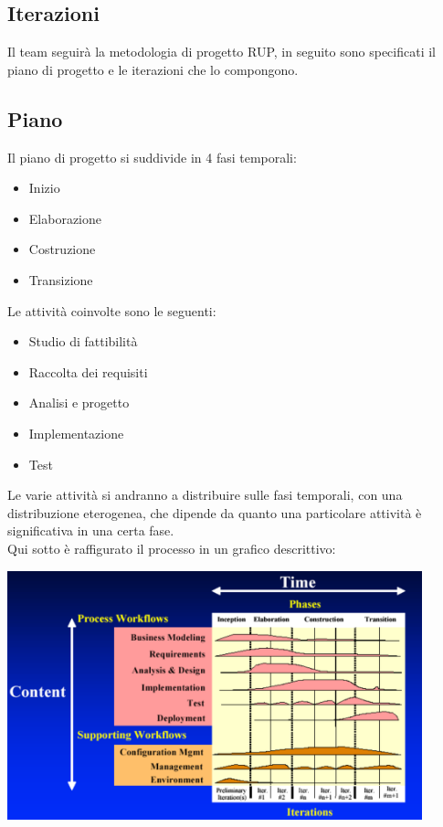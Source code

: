 \setlength{\arrayrulewidth}{.5mm}
\setlength{\tabcolsep}{5pt}
\renewcommand{\arraystretch}{2}

\subsection{Iterazioni}
Il team seguirà la metodologia di progetto RUP, in seguito sono specificati il piano di progetto e le
iterazioni che lo compongono.

\subsection{Piano}
Il piano di progetto si suddivide in 4 fasi temporali:
\begin{itemize}
    \item Inizio
    \item Elaborazione
    \item Costruzione
    \item Transizione
\end{itemize}
Le attività coinvolte sono le seguenti:
\begin{itemize}
    \item Studio di fattibilità
    \item Raccolta dei requisiti
    \item Analisi e progetto
    \item Implementazione
    \item Test
\end{itemize}
Le varie attività si andranno a distribuire sulle fasi temporali, con una distribuzione eterogenea, che
dipende da quanto una particolare attività è significativa in una certa fase.\\
Qui sotto è raffigurato il processo in un grafico descrittivo:

\includegraphics[width=12cm]{images/RUPplan.png}

